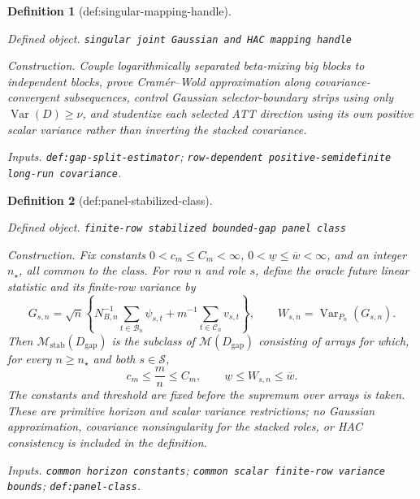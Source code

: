 \documentclass{article}
\newtheorem{definition}{Definition}
\begin{document}
\begin{definition}[def:singular-mapping-handle]\label{def:singular-mapping-handle}
\par\smallskip\noindent\emph{Defined object.} \texttt{singular joint Gaussian and HAC mapping handle}
\par\smallskip\noindent\emph{Construction.} Couple logarithmically separated beta-mixing big blocks to independent blocks, prove Cramér--Wold approximation along covariance-convergent subsequences, control Gaussian selector-boundary strips using only \(\operatorname{Var}(D)\geq\nu\), and studentize each selected ATT direction using its own positive scalar variance rather than inverting the stacked covariance.
\par\smallskip\noindent\emph{Inputs.} \texttt{def:\allowbreak{}gap-\allowbreak{}split-\allowbreak{}estimator}; \texttt{row-\allowbreak{}dependent positive-\allowbreak{}semidefinite long-\allowbreak{}run covariance}.
\end{definition}

\begin{definition}[def:panel-stabilized-class]\label{def:panel-stabilized-class}
\par\smallskip\noindent\emph{Defined object.} \texttt{finite-\allowbreak{}row stabilized bounded-\allowbreak{}gap panel class}
\par\smallskip\noindent\emph{Construction.} Fix constants \(0<c_m\leq C_m<\infty\), \(0<\underline w\leq\overline w<\infty\), and an integer \(n_\star\), all common to the class.  For row \(n\) and role \(s\), define the oracle future linear statistic and its finite-row variance by
\[
 G_{s,n}=\sqrt n\left\{
  N_{B,n}^{-1}\sum_{t\in\mathcal B_n}\psi_{s,t}
  +m^{-1}\sum_{t\in\mathcal C_n}v_{s,t}
 \right\},
 \qquad
 W_{s,n}=\operatorname{Var}_{P_n}(G_{s,n}).
\]
Then \(\mathcal M_{\mathrm{stab}}(D_{\mathrm{gap}})\) is the subclass of \(\mathcal M(D_{\mathrm{gap}})\) consisting of arrays for which, for every \(n\geq n_\star\) and both \(s\in\mathcal S\),
\[
 c_m\leq \frac mn\leq C_m,
 \qquad
 \underline w\leq W_{s,n}\leq\overline w.
\]
The constants and threshold are fixed before the supremum over arrays is taken.  These are primitive horizon and scalar variance restrictions; no Gaussian approximation, covariance nonsingularity for the stacked roles, or HAC consistency is included in the definition.
\par\smallskip\noindent\emph{Inputs.} \texttt{common horizon constants}; \texttt{common scalar finite-\allowbreak{}row variance bounds}; \texttt{def:\allowbreak{}panel-\allowbreak{}class}.
\end{definition}
\end{document}
